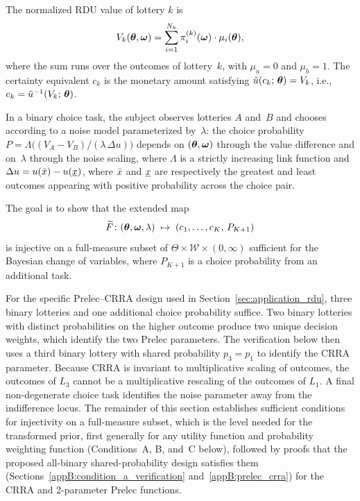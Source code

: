 The normalized RDU value of lottery $k$ is
\begin{equation}
    V_k(\boldsymbol{\theta}, \boldsymbol{\omega})
    = \sum_{i=1}^{N_k} \pi_i^{(k)}(\boldsymbol{\omega}) \cdot \mu_i(\boldsymbol{\theta}),
    \label{eq:rdu_value}
\end{equation}
where the sum runs over the outcomes of lottery~$k$, with
$\mu_a = 0$ and $\mu_b = 1$. The
certainty equivalent $c_k$ is the monetary amount satisfying
$\tilde{u}(c_k;\, \boldsymbol{\theta}) = V_k$, i.e.,
$c_k = \tilde{u}^{-1}(V_k;\, \boldsymbol{\theta})$.

In a binary choice task, the subject observes lotteries $A$ and~$B$ and chooses
according to a noise model parameterized by~$\lambda$: the choice probability
$P = \Lambda\bigl((V_A - V_B)/(\lambda\,\Delta u)\bigr)$ depends on $(\boldsymbol{\theta},
\boldsymbol{\omega})$ through the value difference and on~$\lambda$ through the noise
scaling, where $\Lambda$ is a strictly increasing link function and $\Delta u =
u(\bar{x}) - u(\underline{x})$, where $\bar{x}$ and $\underline{x}$ are respectively the greatest and
least outcomes appearing with positive probability across the choice pair.

The goal is to show that the extended map
\begin{equation}
    \widetilde{F} \colon (\boldsymbol{\theta}, \boldsymbol{\omega}, \lambda) \;\mapsto\;
    (c_1, \ldots, c_K,\, P_{K+1})
\end{equation}
is injective on a full-measure subset of
$\Theta \times \mathcal{W} \times (0,\infty)$ sufficient for the
Bayesian change of variables, where $P_{K+1}$ is a choice probability
from an additional task.

For the specific Prelec--CRRA design used in
Section~\ref{sec:application_rdu}, three binary lotteries and one additional
choice probability suffice. Two binary lotteries with distinct probabilities on
the higher outcome produce two unique decision weights, which identify the two
Prelec parameters. The verification below then uses a third binary lottery with
shared probability $p_3 = p_1$ to identify the CRRA parameter. Because CRRA is
invariant to multiplicative scaling of outcomes, the outcomes of $L_3$ cannot
be a multiplicative rescaling of the outcomes of $L_1$. A final non-degenerate
choice task identifies the noise parameter away from the indifference locus.
The remainder of this section establishes sufficient conditions for injectivity
on a full-measure subset, which is the level needed for the transformed prior,
first generally for any utility function and probability weighting function
(Conditions~A, B, and~C below), followed by proofs that the proposed
all-binary shared-probability design satisfies them
(Sections~\ref{appB:condition_a_verification} and~\ref{appB:prelec_crra}) for the CRRA and
2-parameter Prelec functions.

